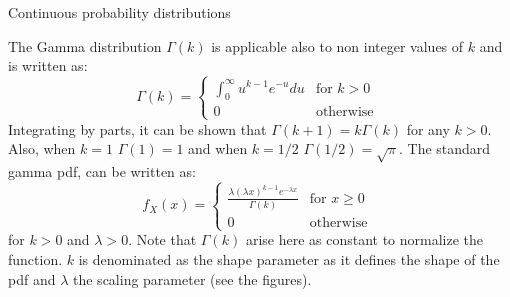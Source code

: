 \documentclass[8pt]{beamer}
\renewcommand{\emph}[1]{\textcolor{myorange}{#1}}
\begin{document}
\begin{frame}{Continuous probability distributions} 
    \begin{block}{The \alert{Gamma} distribution}
         $\Gamma (k)$ is applicable also to non integer  values of $k$ and is written as:
 \[
\Gamma (k) =
\begin{cases}
    \int_0^\infty u^{k-1} e^{-u} du & \text{for } k > 0 \\
    0 & \text{otherwise }
\end{cases}
\]
    Integrating by parts, it can be shown that  $\Gamma (k+1)= k\Gamma (k)$ for any $k > 0$. Also, when $k=1$ $\Gamma (1)=1$ and when $k=1/2$ $\Gamma (1/2) = \sqrt{\pi}$. The \alert{standard gamma} \emph{pdf}, can be written as:
 \[
f_X (x) = 
\begin{cases}
    \frac{\lambda (\lambda x)^{k-1} e^{-\lambda x}}{\Gamma (k)}& \text{for } x \geq 0 \\
    0 & \text{otherwise }
\end{cases}
\]
for $k>0$ and $\lambda > 0$. Note that $\Gamma (k)$ arise here as constant to normalize the function. $k$ is denominated as the \emph{shape parameter} as it defines the shape of the \emph{pdf} and $\lambda$ the \emph{scaling parameter} (see the figures).


\end{block}
\end{frame}
\end{document}

